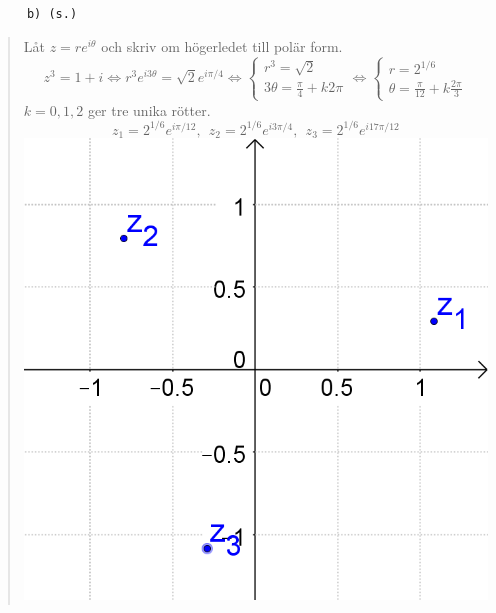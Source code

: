 \documentclass[a4paper]{article}
\newcommand{\tskcol}[1]{\textcolor{tskcol}{#1}}
\begin{document}
	\texttt{\tskcol{~~~~~~b) (s.)}}
	\begin{quotation}
		\noindent
		Låt $z=re^{i\theta}$ och skriv om högerledet till polär form.
		\[z^3=1+i \Leftrightarrow
		r^3e^{i3\theta}=\sqrt{2}e^{i\pi/4} \Leftrightarrow
		\begin{cases}
		r^3 = \sqrt{2} \\
		3\theta=\frac{\pi}{4}+k2\pi
		\end{cases} \Leftrightarrow
		\begin{cases}
		r=2^{1/6} \\
		\theta=\frac{\pi}{12}+k\frac{2\pi}{3}
		\end{cases}\] 
		$k=0,1,2$ ger tre unika rötter.
		\[z_1=2^{1/6}e^{i\pi/12},~~
		z_2=2^{1/6}e^{i3\pi/4},~~
		z_3=2^{1/6}e^{i17\pi/12}\]
		\includegraphics[scale=0.2]{images/641b.PNG}
	\end{quotation}
	
\end{document}
